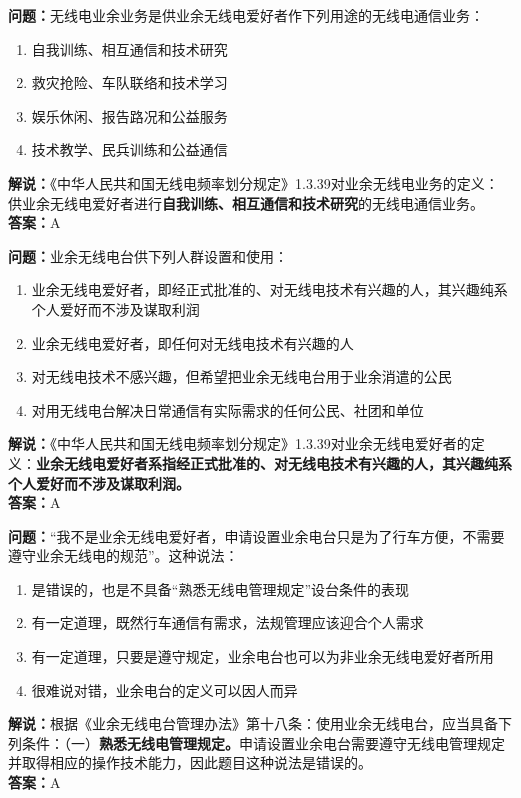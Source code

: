 \textbf{问题：}无线电业余业务是供业余无线电爱好者作下列用途的无线电通信业务：
\begin{enumerate}[label=\Alph*), leftmargin=1cm]
	\item 自我训练、相互通信和技术研究
	\item 救灾抢险、车队联络和技术学习
	\item 娱乐休闲、报告路况和公益服务
	\item 技术教学、民兵训练和公益通信
\end{enumerate}
\textbf{解说：}《中华人民共和国无线电频率划分规定》1.3.39对业余无线电业务的定义：供业余无线电爱好者进行\textbf{自我训练、相互通信和技术研究}的无线电通信业务。\\\textbf{答案：}A

\textbf{问题：}业余无线电台供下列人群设置和使用：
\begin{enumerate}[label=\Alph*), leftmargin=1cm]
	\item 业余无线电爱好者，即经正式批准的、对无线电技术有兴趣的人，其兴趣纯系个人爱好而不涉及谋取利润
	\item 业余无线电爱好者，即任何对无线电技术有兴趣的人
	\item 对无线电技术不感兴趣，但希望把业余无线电台用于业余消遣的公民
	\item 对用无线电台解决日常通信有实际需求的任何公民、社团和单位
\end{enumerate}
\textbf{解说：}《中华人民共和国无线电频率划分规定》1.3.39对业余无线电爱好者的定义：\textbf{业余无线电爱好者系指经正式批准的、对无线电技术有兴趣的人，其兴趣纯系个人爱好而不涉及谋取利润。}\\\textbf{答案：}A

\textbf{问题：}“我不是业余无线电爱好者，申请设置业余电台只是为了行车方便，不需要遵守业余无线电的规范”。这种说法：
\begin{enumerate}[label=\Alph*), leftmargin=1cm]
	\item 是错误的，也是不具备“熟悉无线电管理规定”设台条件的表现
	\item 有一定道理，既然行车通信有需求，法规管理应该迎合个人需求
	\item 有一定道理，只要是遵守规定，业余电台也可以为非业余无线电爱好者所用
	\item 很难说对错，业余电台的定义可以因人而异
\end{enumerate}
\textbf{解说：}根据《业余无线电台管理办法》第十八条：使用业余无线电台，应当具备下列条件：（一）\textbf{熟悉无线电管理规定。}申请设置业余电台需要遵守无线电管理规定并取得相应的操作技术能力，因此题目这种说法是错误的。\\\textbf{答案：}A

